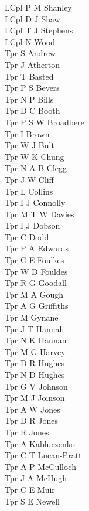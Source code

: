 \begin{multicols}{4}
  LCpl P M Shanley \\
  LCpl D J Shaw \\
  LCpl T J Stephens \\
  LCpl N Wood \\
  Tpr S Andrew \\
  Tpr J Atherton \\
  Tpr T Basted \\
  Tpr P S Bevers \\
  Tpr N P Bills \\
  Tpr D C Booth \\
  Tpr P S W Broadbere \\
  Tpr I Brown \\
  Tpr W J Bult \\
  Tpr W K Chung \\
  Tpr N A B Clegg \\
  Tpr J W Cliff \\
  Tpr L Collins \\
  Tpr I J Connolly \\
  Tpr M T W Davies \\
  Tpr I J Dobson \\
  Tpr C Dodd \\
  Tpr P A Edwards \\
  Tpr C E Foulkes \\
  Tpr W D Fouldes \\
  Tpr R G Goodall \\
  Tpr M A Gough \\
  Tpr A G Griffiths \\
  Tpr M Gynane \\
  Tpr J T Hannah \\
  Tpr N K Hannan \\
  Tpr M G Harvey \\
  Tpr D R Hughes \\
  Tpr N D Hughes \\
  Tpr G V Johnson \\
  Tpr M J Joinson \\
  Tpr A W Jones \\
  Tpr D R Jones \\
  Tpr R Jones \\
  Tpr A Kabluczenko \\
  Tpr C T Lucan-Pratt \\
  Tpr A P McCulloch \\
  Tpr J A McHugh \\
  Tpr C E Muir \\
  Tpr S E Newell \\

\end{multicols}
